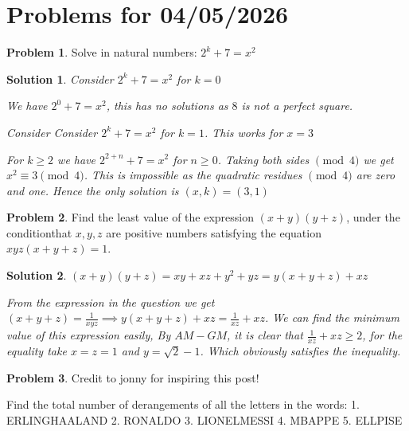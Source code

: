 \documentclass[11pt, leqno]{article}
\theoremstyle{definition}
\newtheorem{problem}{Problem}
\theoremstyle{plain}
\newtheorem*{solution}{Solution}
\begin{document}
\section*{Problems for 04/05/2026}

\begin{problem}
Solve in natural numbers: $2^{k} + 7 = x^2$
\end{problem}

\begin{solution}
Consider $2^{k} + 7 = x^2$ for $k = 0$

We have $2^{0} + 7 = x^{2}$, this has no solutions as $8$ is not a perfect square. 

Consider Consider $2^{k} + 7 = x^2$ for $k = 1$. This works for $x = 3$

For $k \ge 2$ we have $2^{2 + n} + 7 = x^{2}$ for $n \ge 0$. Taking both sides $\pmod{4}$ we get $x^{2} \equiv 3\pmod{4}$. This is impossible as the quadratic residues $\pmod{4}$ are zero and one. Hence the only solution is $(x, k) = (3, 1)$

\end{solution}


\begin{problem}
Find the least value of the expression $(x+y)(y+z)$, under the conditionthat $x,y,z$ are positive numbers satisfying the equation $xyz(x + y + z) = 1$.
\end{problem}

\begin{solution}
$(x + y)(y + z) = xy + xz + y^{2} + yz = y(x + y + z) + xz$

From the expression in the question we get $(x + y + z) = \displaystyle{\frac{1}{xyz}} \implies y(x + y + z) + xz = \frac{1}{xz} + xz$. We can find the minimum value of this expression easily, By $AM-GM$, it is clear that $\displaystyle{\frac{1}{xz}} + xz \ge 2$, for the equality take $x = z = 1$ and $y = \sqrt{2} - 1$. Which obviously satisfies the inequality.

\end{solution}



\begin{problem}
Credit to jonny for inspiring this post!

Find the total number of derangements of all the letters in the words:
1. ERLINGHAALAND
2. RONALDO
3. LIONELMESSI
4. MBAPPE
5. ELLPISE
\end{problem}
\end{document}
